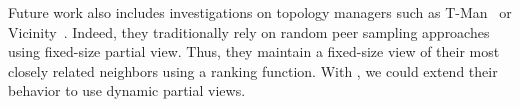 
Future work also includes investigations on topology managers such as
T-Man~\cite{jelasity2009tman} or Vicinity~\cite{voulgaris2005epidemic}. Indeed,
they traditionally rely on random peer sampling approaches using fixed-size
partial view. Thus, they maintain a fixed-size view of their most closely
related neighbors using a ranking function. With \SPRAY, we could extend their
behavior to use dynamic partial views.

